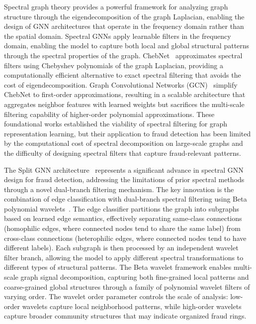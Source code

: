 Spectral graph theory provides a powerful framework for analyzing graph
structure through the eigendecomposition of the graph Laplacian, enabling the
design of GNN architectures that operate in the frequency domain rather than the
spatial domain. Spectral GNNs apply learnable filters in the frequency domain,
enabling the model to capture both local and global structural patterns through
the spectral properties of the graph. ChebNet~\cite{defferrard2016convolutional}
approximates spectral filters using Chebyshev polynomials of the graph
Laplacian, providing a computationally efficient alternative to exact spectral
filtering that avoids the cost of eigendecomposition. Graph Convolutional
Networks (GCN)~\cite{kipf2017semisupervised} simplify ChebNet to first-order
approximations, resulting in a scalable architecture that aggregates neighbor
features with learned weights but sacrifices the multi-scale filtering
capability of higher-order polynomial approximations. These foundational works
established the viability of spectral filtering for graph representation
learning, but their application to fraud detection has been limited by the
computational cost of spectral decomposition on large-scale graphs and the
difficulty of designing spectral filters that capture fraud-relevant patterns.

The Split GNN architecture~\cite{wu2023splitgnn} represents a significant
advance in spectral GNN design for fraud detection, addressing the limitations
of prior spectral methods through a novel dual-branch filtering mechanism. The
key innovation is the combination of edge classification with dual-branch
spectral filtering using Beta polynomial wavelets~\cite{hammond2011wavelets}.
The edge classifier partitions the graph into subgraphs based on learned edge
semantics, effectively separating same-class connections (homophilic edges,
where connected nodes tend to share the same label) from cross-class connections
(heterophilic edges, where connected nodes tend to have different labels). Each
subgraph is then processed by an independent wavelet filter branch, allowing the
model to apply different spectral transformations to different types of
structural patterns. The Beta wavelet framework enables multi-scale graph signal
decomposition, capturing both fine-grained local patterns and coarse-grained
global structures through a family of polynomial wavelet filters of varying
order. The wavelet order parameter controls the scale of analysis: low-order
wavelets capture local neighborhood patterns, while high-order wavelets capture
broader community structures that may indicate organized fraud rings.

